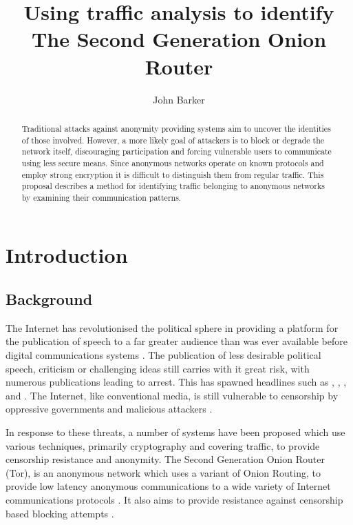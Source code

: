 \documentclass{ecuthesis}
\title{Using traffic analysis to identify The Second Generation Onion Router}
\author{John Barker}
\begin{document}
\maketitle

\begin{abstract}
\thispagestyle{empty}

Traditional attacks against anonymity providing systems aim to uncover the
identities of those involved. However, a more likely goal of attackers is to
block or degrade the network itself, discouraging participation and forcing
vulnerable users to communicate using less secure means. Since anonymous
networks operate on known protocols and employ strong encryption it is
difficult to distinguish them from regular traffic. This proposal describes a
method for identifying traffic belonging to anonymous networks by examining
their communication patterns.

\end{abstract}

\chapter{Introduction}

\section{Background}

The Internet has revolutionised the political sphere in providing a platform
for the publication of speech to a far greater audience than was ever available
before digital communications systems \parencite{Bonchek:1997p3455}. The
publication of less desirable political speech, criticism or challenging ideas
still carries with it great risk, with numerous publications leading to arrest.
This has spawned headlines such as \textcite{website:egypt-arrests},
\parencite{website:china-yahoo-torture},
\parencite{website:vietnam-bloggers-arrested},
\textcite{website:iran-bloggers-arrested} and
 \parencite{website:blogger-arrests}. The
Internet, like conventional media, is still vulnerable to censorship by
oppressive governments and malicious attackers
\parencite{Crandall:2007p6165,Karlin:2009p6166}.

In response to these threats, a number of systems have been proposed which use
various techniques, primarily cryptography and covering traffic, to provide
censorship resistance and anonymity. The Second Generation Onion Router (Tor),
is an anonymous network which uses a variant of Onion Routing, to provide low
latency anonymous communications to a wide variety of Internet communications
protocols \parencite{Dingledine:2004p314}. It also aims to provide resistance
against censorship based blocking attempts \parencite{Dingledine:2008p1542}.
\end{document}
